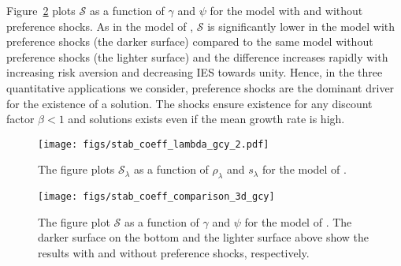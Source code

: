 \documentclass[12pt, reqno]{amsart}
\newcommand{\1}{\mathbbm 1}
\newcommand{\sS}{\mathscr S}
\theoremstyle{plain}
\theoremstyle{definition}
\begin{document}
Figure~\ref{f:stab_coeff_comparison_3d_gcy} plots $\sS$ as a function of
$\gamma$ and $\psi$ for the model with and without preference shocks. As in
the model of \cite{schorfheide2018identifying}, $\sS$ is significantly lower
in the model with preference shocks (the darker surface) compared to the same
model without preference shocks (the lighter surface) and the difference
increases rapidly with increasing risk aversion and decreasing IES towards
unity. Hence, in the three quantitative applications we consider, preference
shocks are the dominant driver for the existence of a solution. The shocks
ensure existence for any discount factor $\beta < 1$ and solutions exists
even if the mean growth rate is high.
\begin{figure}
	\centering
	\texttt{[image: figs/stab\_coeff\_lambda\_gcy\_2.pdf]}
	\caption{\label{f:stab_coeff_lambda_gcy_2} The figure plots $\sS_\lambda$ as a function of $\rho_\lambda $
		and $s_\lambda$ for the model of \cite{GomezYaron2020}.}
\end{figure}
\begin{figure}
	\centering
	\texttt{[image: figs/stab\_coeff\_comparison\_3d\_gcy]}
	\caption{\label{f:stab_coeff_comparison_3d_gcy}The figure plot $\sS$ as a
      function of $\gamma$ and $\psi$ for the model of \cite{GomezYaron2020}.
      The darker surface on the bottom and the lighter surface above show the
      results with and without preference shocks, respectively.}
\end{figure}



\end{document}
